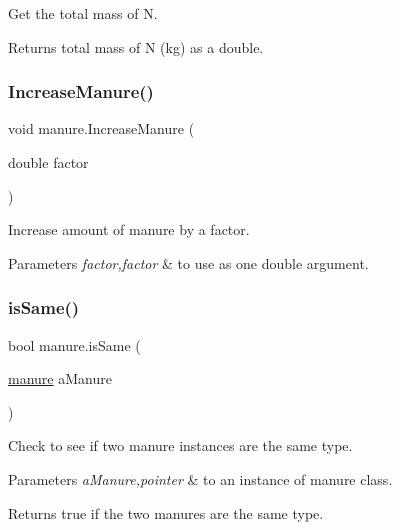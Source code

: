 Get the total mass of N. 

\begin{DoxyReturn}{Returns}
total mass of N (kg) as a double. 
\end{DoxyReturn}
\mbox{\label{classmanure_a1410845b6c2f5815fde0170a3af74f6c}} 
\subsubsection{\texorpdfstring{IncreaseManure()}{IncreaseManure()}}
{\footnotesize\ttfamily void manure.\+Increase\+Manure (\begin{DoxyParamCaption}\item[{double}]{factor }\end{DoxyParamCaption})\hspace{0.3cm}{\ttfamily [inline]}}



Increase amount of manure by a factor. 


\begin{DoxyParams}{Parameters}
{\em factor,factor} & to use as one double argument. \\
\hline
\end{DoxyParams}
\mbox{\label{classmanure_a4d39a3bf380840fb4295100fa9a476ec}} 
\subsubsection{\texorpdfstring{isSame()}{isSame()}}
{\footnotesize\ttfamily bool manure.\+is\+Same (\begin{DoxyParamCaption}\item[{\mbox{\hyperlink{classmanure}{manure}}}]{a\+Manure }\end{DoxyParamCaption})\hspace{0.3cm}{\ttfamily [inline]}}



Check to see if two manure instances are the same type. 


\begin{DoxyParams}{Parameters}
{\em a\+Manure,pointer} & to an instance of manure class. \\
\hline
\end{DoxyParams}
\begin{DoxyReturn}{Returns}
true if the two manures are the same type. 
\end{DoxyReturn}
\mbox{\label{classmanure_a05f0baca8b6fcef8b2bf465cf11a50ab}} 
